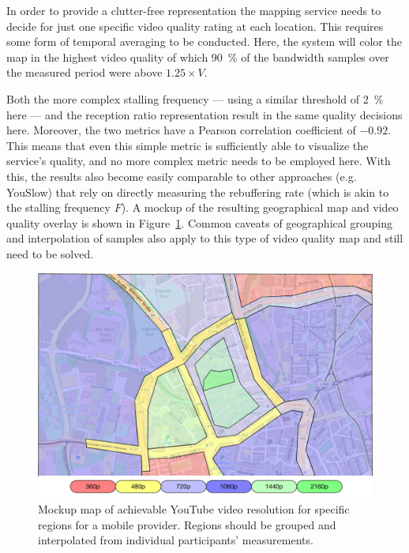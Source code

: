 In order to provide a clutter-free representation the mapping service needs to decide for just one specific video quality rating at each location. This requires some form of temporal averaging to be conducted. Here, the system will color the map in the highest video quality of which \SI{90}{\percent} of the bandwidth samples over the measured period were above $1.25 \times V$.

Both the more complex stalling frequency --- using a similar threshold of \SI{2}{\percent} here --- and the reception ratio representation result in the same quality decisions here. Moreover, the two metrics have a Pearson correlation coefficient of $-0.92$. This means that even this simple metric is sufficiently able to visualize the service's quality, and no more complex metric needs to be employed here. With this, the results also become easily comparable to other approaches  (e.g. YouSlow\cite{Nam:2014:YPA:2619239.2631433}) that rely on directly measuring the rebuffering rate (which is akin to the stalling frequency $F$). A mockup of the resulting geographical map and video quality overlay is shown in Figure~\ref{fig:videoquality-map}. Common caveats of geographical grouping and interpolation of samples also apply to this type of video quality map and still need to be solved.

\begin{figure}[!t]
	\centering
	\includegraphics[width=1.0\columnwidth]{images/qoe-map-mockup.pdf}
	\caption{Mockup map of achievable YouTube video resolution for specific regions for a mobile provider. Regions should be grouped and interpolated from individual participants' measurements.}
\label{fig:videoquality-map}
\end{figure}


